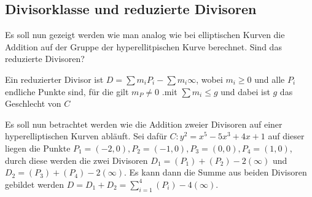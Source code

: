 \subsection{Divisorklasse und reduzierte Divisoren}
Es soll nun gezeigt werden wie man analog wie bei elliptischen Kurven die Addition auf der Gruppe der hyperellitpischen Kurve berechnet. Sind das reduzierte Divisoren?
\begin{definition}
  Ein reduzierter Divisor ist $D=\sum m_iP_i-\sum m_i\infty$, wobei $m_i\geq 0$ und alle $P_i$ endliche Punkte sind, für die gilt $m_P\neq 0$ .mit $\sum m_i\leq g$ und dabei ist $g$ das Geschlecht von $C$
\end{definition}
\cite[S.17]{Menezes96}
Es soll nun betrachtet werden wie die Addition zweier Divisoren auf einer hyperelliptischen Kurven abläuft. Sei dafür $C:y^2=x^5-5x^3+4x+1$ auf dieser liegen die Punkte $P_1=(-2,0),P_2=(-1,0),P_3=(0,0), P_4=(1,0)$, durch diese werden die zwei Divisoren $D_1=(P_1)+(P_2)-2(\infty)$ und $D_2=(P_3)+(P_4)-2(\infty)$. Es kann dann die Summe aus beiden Divisoren gebildet werden $D=D_1+D_2=\sum_{i=1}^{4}(P_i)-4(\infty)$.

